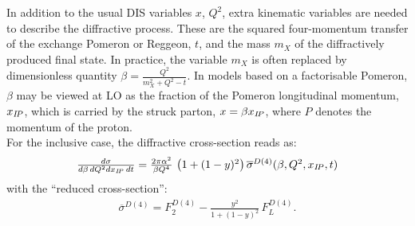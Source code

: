 In addition to the usual DIS variables $x$, $Q^2$, extra kinematic variables are needed to describe the diffractive process. These are the squared four-momentum transfer of the exchange Pomeron or Reggeon, $t$, and 
the mass $m_X$ of the diffractively produced final state. 
In practice, the variable $m_X$ 
is often replaced by dimensionless quantity $\beta=\frac{Q^2}{m_X^2+Q^2-t}$.
In models based on a factorisable Pomeron, $\beta$ may be viewed at LO as the fraction of the
Pomeron longitudinal momentum, $x_{{I\!P}}$, which is carried by the struck parton, $x=\beta x_{{I\!P}}$,
where $P$ denotes the momentum of the proton.
\\
For the inclusive case, the diffractive cross-section reads as:
\begin{equation}
\begin{array}{lcl}
  \frac{d\sigma}{d\beta\,dQ^2dx_{{I\!P}}\,dt}
=
  \frac{2\pi\alpha^2}{\beta Q^4}\,
    \left( 1 +  (1-y)^2 \right) \overline\sigma^{D(4)}(\beta,Q^2,x_{{I\!P}},t)
\label{Dxs}
\end{array}
\end{equation}
with the ``reduced cross-section'': 
\begin{equation}
\begin{array}{lcl}
\overline\sigma^{D(4)}
 = F_2^{D(4)} - \frac{y^2}{1 +  (1-y)^2}\, F_L^{D(4)}.
\label{eq:sigred}
\end{array}
\end{equation}

